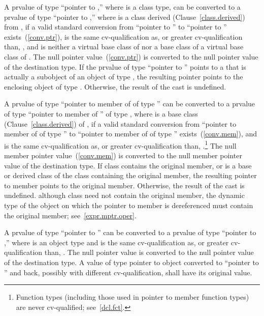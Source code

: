 \pnum
{}%
%
A prvalue of type ``pointer to  ,'' where 
is a class type, can be converted to a prvalue of type ``pointer to
 ,'' where  is a class derived
(Clause~\ref{class.derived}) from , if a valid standard
conversion from ``pointer to '' to ``pointer to ''
exists~(\ref{conv.ptr}),  is the same cv-qualification as,
or greater cv-qualification than, , and  is neither
a virtual base class of  nor a base class of a virtual base
class of . The null pointer value~(\ref{conv.ptr}) is converted
to the null pointer value of the destination type. If the prvalue of type
``pointer to  '' points to a  that is
actually a subobject of an object of type , the resulting
pointer points to the enclosing object of type . Otherwise, the
result of the cast is undefined.

\pnum
{}%
A prvalue of type ``pointer to member of  of type 
'' can be converted to a prvalue of type ``pointer to member of
'' of type  , where  is a base
class (Clause~\ref{class.derived}) of , if a valid standard
conversion from ``pointer to member of  of type '' to
``pointer to member of  of type ''
exists~(\ref{conv.mem}), and  is the same cv-qualification
as, or greater cv-qualification than, .\footnote{Function types
(including those used in pointer to member function
types) are never cv-qualified; see~\ref{dcl.fct}.}
The null member pointer value~(\ref{conv.mem}) is converted to the null
member pointer value of the destination type. If class 
contains the original member, or is a base or derived class of the class
containing the original member, the resulting pointer to member points
to the original member. Otherwise, the result of the cast is undefined.
\enternote 
although class  need not contain the original member, the
dynamic type of the object on which the pointer to member is
dereferenced must contain the original member; see~\ref{expr.mptr.oper}.
\exitnote 

\pnum
A prvalue of type ``pointer to  '' can be
converted to a prvalue of type ``pointer to  ,''
where  is an object type and  is the same
cv-qualification as, or greater cv-qualification than, . The
null pointer value is converted to the null pointer value of the
destination type. A value of type pointer to object converted to
``pointer to  '' and back, possibly with
different cv-qualification, shall have its original value.
\enterexample

